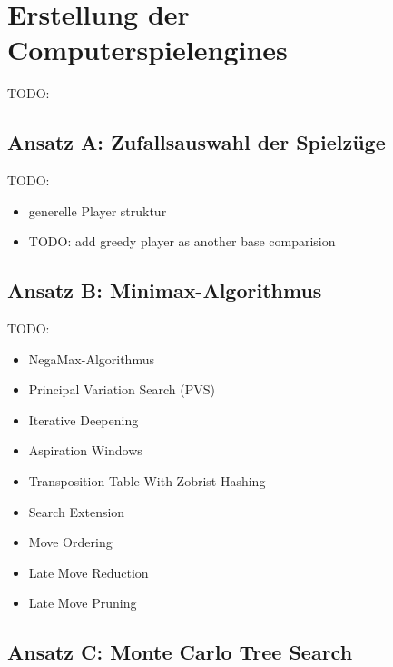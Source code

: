 \chapter{Erstellung der Computerspielengines}
\label{chapter:erstellung-der-computerspielengines}

TODO:

\section{Ansatz A: Zufallsauswahl der Spielzüge}
\label{section:erstellung-ansatz-a}

TODO:

\begin{itemize}
    \item generelle Player struktur
    \item TODO: add greedy player as another base comparision
\end{itemize}




\section{Ansatz B: Minimax-Algorithmus}
\label{section:erstellung-ansatz-b}

TODO:

\begin{itemize}
    \item NegaMax-Algorithmus
    \item Principal Variation Search (PVS)
    \item Iterative Deepening
    \item Aspiration Windows
    \item Transposition Table With Zobrist Hashing
    \item Search Extension
    \item Move Ordering
    \item Late Move Reduction
    \item Late Move Pruning
\end{itemize}

\section{Ansatz C: Monte Carlo Tree Search}
\label{section:erstellung-ansatz-c}

